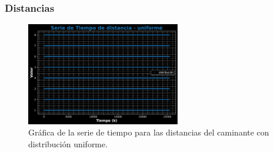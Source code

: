 \documentclass[11pt]{article} %
\begin{document}
	\subsubsection{Distancias}
	 \begin{figure}[h]
	 	\centering
	 	\includegraphics[width=0.6\textwidth]{graf_distancia_uniforme.pdf}
	 	\caption{Gráfica de la serie de tiempo para las distancias del caminante con distribución uniforme.}
	 	\label{fig:distUnifGraf}
	 \end{figure}
\end{document}
